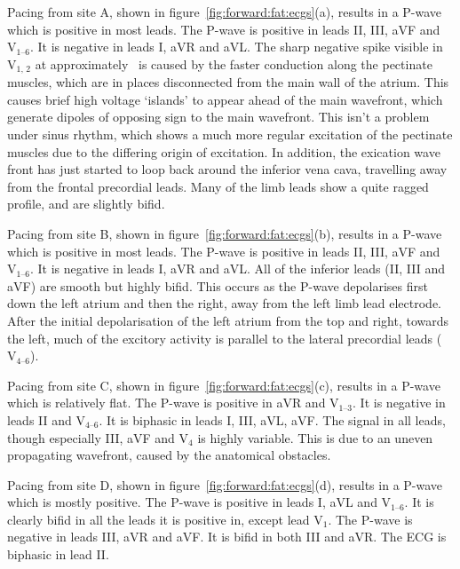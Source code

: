 Pacing from site A, shown in figure~\ref{fig:forward:fat:ecgs}(a), results in a
P-wave which is positive in most leads.
The P-wave is positive in leads II, III, aVF and $\text{V}_{\text{1--6}}$.
It is negative in leads I, aVR and aVL.
The sharp negative spike visible in $\text{V}_{\text{1, 2}}$ at approximately
\ is caused by the faster conduction along the pectinate muscles, which
are in places disconnected from the main wall of the atrium.
This causes brief high voltage `islands' to appear ahead of the main wavefront,
which generate dipoles of opposing sign to the main wavefront.
This isn't a problem under sinus rhythm, which shows a much more regular
excitation of the pectinate muscles due to the differing origin of excitation.
In addition, the exication wave front has just started to loop back around the
inferior vena cava, travelling away from the frontal precordial leads.
Many of the limb leads show a quite ragged profile, and are slightly bifid.

Pacing from site B, shown in figure~\ref{fig:forward:fat:ecgs}(b), results in a
P-wave which is positive in most leads.
The P-wave is positive in leads II, III, aVF and $\text{V}_{\text{1--6}}$.
It is negative in leads I, aVR and aVL.
All of the inferior leads (II, III and aVF) are smooth but highly bifid.
This occurs as the P-wave depolarises first down the left atrium and then the
right, away from the left limb lead electrode.
After the initial depolarisation of the left atrium from the top and right,
towards the left, much of the excitory activity is parallel to the lateral
precordial leads ($\text{V}_{\text{4--6}}$).

Pacing from site C, shown in figure~\ref{fig:forward:fat:ecgs}(c), results in a
P-wave which is relatively flat.
The P-wave is positive in aVR and $\text{V}_{\text{1--3}}$.
It is negative in leads II and $\text{V}_{\text{4--6}}$.
It is biphasic in leads I, III, aVL, aVF.
The signal in all leads, though especially III, aVF and $\text{V}_{\text{4}}$ is
highly variable.
This is due to an uneven propagating wavefront, caused by the anatomical
obstacles.

Pacing from site D, shown in figure~\ref{fig:forward:fat:ecgs}(d), results in a
P-wave which is mostly positive.
The P-wave is positive in leads I, aVL and $\text{V}_{\text{1--6}}$.
It is clearly bifid in all the leads it is positive in, except lead
$\text{V}_{\text{1}}$.
The P-wave is negative in leads III, aVR and aVF.
It is bifid in both III and aVR.
The ECG is biphasic in lead II.

